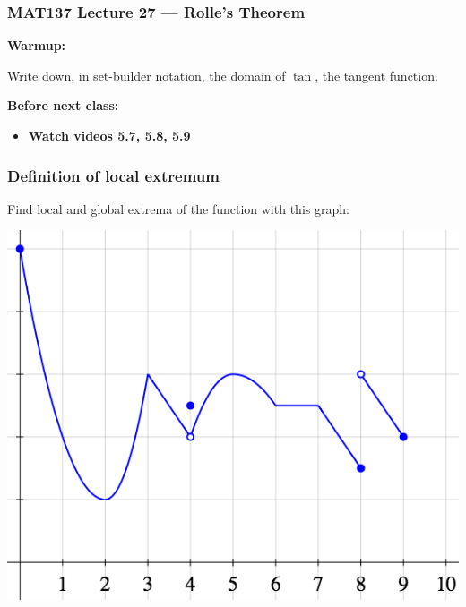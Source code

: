 \documentclass[14pt]{beamer}
\begin{document}
\begin{frame}
	\frametitle{MAT137 Lecture 27 --- Rolle's Theorem}

	{\bf Warmup:}

	Write down, in set-builder notation, the domain of $\tan$, the tangent function.

	\vfill
	{\bf Before next class:}
		\begin{itemize} \normalsize
			\item {\bf Watch videos  5.7, 5.8, 5.9}
		\end{itemize}
\end{frame}
	\begin{frame}
		\frametitle{Definition of local extremum}

		Find local and global extrema of the function with this graph:

		\begin{center}
			\includegraphics[scale=.42]{G13}
		\end{center}
	\end{frame}




\end{document}
